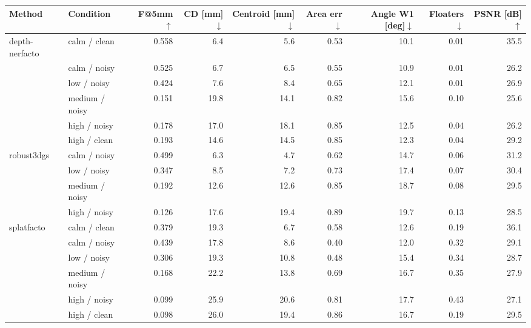 \begin{tabular}{llrrrrrrr}
\toprule
Method & Condition & F@5mm$\uparrow$ & CD [mm]$\downarrow$ & Centroid [mm]$\downarrow$ & Area err$\downarrow$ & Angle W1 [deg]$\downarrow$ & Floaters$\downarrow$ & PSNR [dB]$\uparrow$ \\
\midrule
depth-nerfacto & calm / clean & 0.558 & 6.4 & 5.6 & 0.53 & 10.1 & 0.01 & 35.5 \\
 & calm / noisy & 0.525 & 6.7 & 6.5 & 0.55 & 10.9 & 0.01 & 26.2 \\
 & low / noisy & 0.424 & 7.6 & 8.4 & 0.65 & 12.1 & 0.01 & 26.9 \\
 & medium / noisy & 0.151 & 19.8 & 14.1 & 0.82 & 15.6 & 0.10 & 25.6 \\
 & high / noisy & 0.178 & 17.0 & 18.1 & 0.85 & 12.5 & 0.04 & 26.2 \\
 & high / clean & 0.193 & 14.6 & 14.5 & 0.85 & 12.3 & 0.04 & 29.2 \\
\midrule
robust3dgs & calm / noisy & 0.499 & 6.3 & 4.7 & 0.62 & 14.7 & 0.06 & 31.2 \\
 & low / noisy & 0.347 & 8.5 & 7.2 & 0.73 & 17.4 & 0.07 & 30.4 \\
 & medium / noisy & 0.192 & 12.6 & 12.6 & 0.85 & 18.7 & 0.08 & 29.5 \\
 & high / noisy & 0.126 & 17.6 & 19.4 & 0.89 & 19.7 & 0.13 & 28.5 \\
\midrule
splatfacto & calm / clean & 0.379 & 19.3 & 6.7 & 0.58 & 12.6 & 0.19 & 36.1 \\
 & calm / noisy & 0.439 & 17.8 & 8.6 & 0.40 & 12.0 & 0.32 & 29.1 \\
 & low / noisy & 0.306 & 19.3 & 10.8 & 0.48 & 15.4 & 0.34 & 28.7 \\
 & medium / noisy & 0.168 & 22.2 & 13.8 & 0.69 & 16.7 & 0.35 & 27.9 \\
 & high / noisy & 0.099 & 25.9 & 20.6 & 0.81 & 17.7 & 0.43 & 27.1 \\
 & high / clean & 0.098 & 26.0 & 19.4 & 0.86 & 16.7 & 0.19 & 29.5 \\
\bottomrule
\end{tabular}
